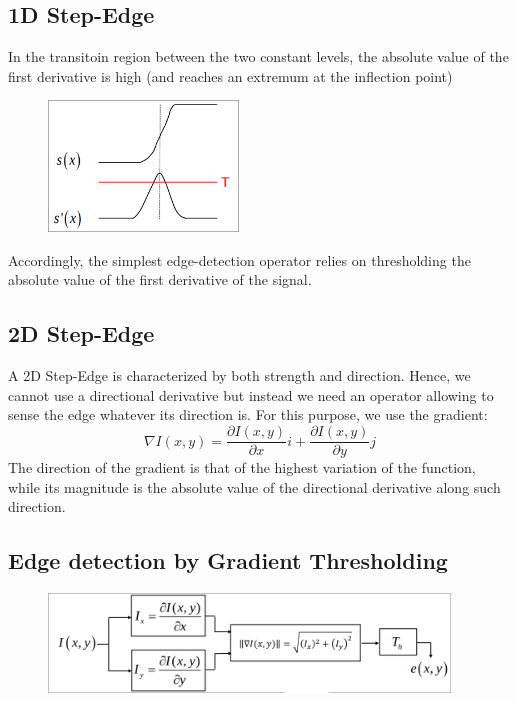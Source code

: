 \documentclass{article}
\begin{document}
\subsection{1D Step-Edge} %
In the transitoin region between the two constant levels, the absolute value of the first derivative is high (and reaches an extremum at the inflection point)
\begin{figure}[!ht]
    \begin{center}
        \includegraphics[width=0.45\textwidth]{1dstepedge}
    \end{center}
    \label{fig:1dstep}
\end{figure}
Accordingly, the simplest edge-detection operator relies on thresholding the absolute value of the first derivative of the signal. 
\subsection{2D Step-Edge} %
A 2D Step-Edge is characterized by both strength and direction. Hence, we cannot use a directional derivative but instead we need an operator allowing to sense the edge whatever its direction is. For this purpose, we use the gradient:
\[
    \nabla I(x,y)=\displaystyle\frac{\partial I (x,y)}{\partial x}i + \displaystyle\frac{\partial I (x,y)}{\partial y} j
\]
The direction of the gradient is that of the highest variation of the function, while its magnitude is the absolute value of the directional derivative along such direction. 

\subsection{Edge detection by Gradient Thresholding}
\begin{figure}[!ht]
    \begin{center}
        \includegraphics[width=0.95\textwidth]{edging}
    \end{center}
    \label{fig:edging}
\end{figure}
\end{document}
